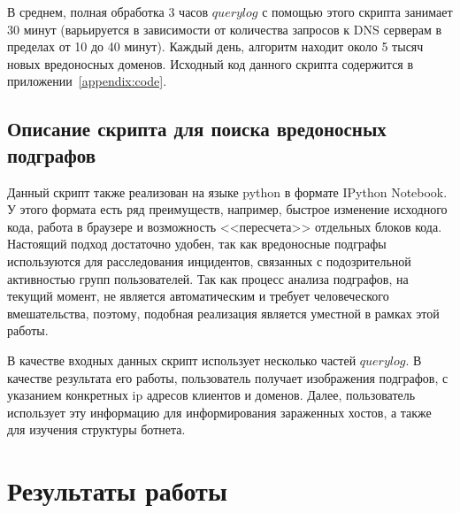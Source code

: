 \documentclass[a4paper,14pt]{extreport} %
\begin{document}
В среднем, полная обработка 3 часов $querylog$ с помощью этого скрипта занимает 30 минут (варьируется в зависимости от количества запросов к DNS серверам в пределах от 10 до 40 минут). Каждый день, алгоритм находит около 5 тысяч новых вредоносных доменов. Исходный код данного скрипта содержится в приложении~\ref{appendix:code}.


\section{Описание скрипта для поиска вредоносных подграфов}
Данный скрипт также реализован на языке python в формате IPython Notebook. У этого формата есть ряд преимуществ, например, быстрое изменение исходного кода, работа в браузере и возможность <<пересчета>> отдельных блоков кода. Настоящий подход достаточно удобен, так как вредоносные подграфы используются для расследования инцидентов, связанных с подозрительной активностью групп пользователей. Так как процесс анализа подграфов, на текущий момент, не является автоматическим и требует человеческого вмешательства, поэтому, подобная реализация является уместной в рамках этой работы.

В качестве входных данных скрипт использует несколько частей $querylog$. В качестве результата его работы, пользователь получает изображения подграфов, с указанием конкретных ip адресов клиентов и доменов. Далее, пользователь использует эту информацию для информирования зараженных хостов, а также для изучения структуры ботнета.

\chapter{Результаты работы}
\end{document}
